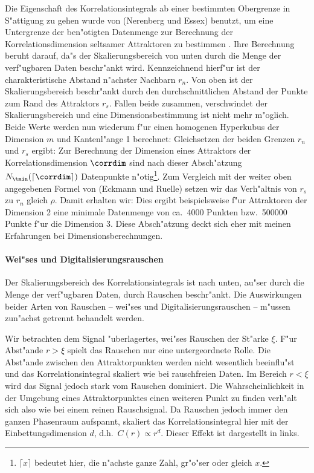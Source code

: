 Die Eigenschaft des Korrelationsintegrals ab einer bestimmten Obergrenze in S"attigung zu
gehen wurde von \autor(Nerenberg und Essex) benutzt, um eine Untergrenze der
ben"otigten Datenmenge zur Berechnung der Korrelationsdimension seltsamer Attraktoren
 zu bestimmen \cite{Nerenberg-essex}. Ihre Berechnung beruht darauf, da"s der Skalierungsbereich
von unten durch die Menge der verf"ugbaren Daten beschr"ankt wird. Kennzeichnend hierf"ur
ist der charakteristische Abstand n"achster Nachbarn $r_n$. Von oben ist der Skalierungsbereich
beschr"ankt durch den durchschnittlichen Abstand der Punkte zum Rand des Attraktors
$r_s$. Fallen beide zusammen, verschwindet der Skalierungsbereich und eine
Dimensionsbestimmung ist nicht mehr m"oglich. Beide Werte werden nun wiederum f"ur einen
homogenen Hyperkubus der Dimension $m$ und Kantenl"ange 1 berechnet\footnotemark:
Gleichsetzen der beiden Grenzen $r_n$ und $r_s$ ergibt:
Zur Berechnung der Dimension eines Attraktors der Korrelationsdimension $\corrdim$ sind nach
dieser Absch"atzung $N_\tmin(\lceil \corrdim \rceil)$ Datenpunkte n"otig\footnote{$\lceil x \rceil$
bedeutet hier, die n"achste ganze Zahl, gr"o"ser oder gleich $x$.}. Zum Vergleich mit der
weiter oben angegebenen Formel von \autor(Eckmann und Ruelle) setzen wir das Verh"altnis
von $r_s$ zu $r_n$ gleich $\rho$. Damit erhalten wir:
Dies ergibt beispielsweise f"ur Attraktoren der Dimension 2 eine minimale Datenmenge von
ca.\  4000 Punkten bzw.\  500000 Punkte f"ur die Dimension 3. Diese Absch"atzung deckt
sich eher mit meinen Erfahrungen bei Dimensionsberechnungen. 





\paragraph{Wei"ses und Digitalisierungsrauschen}
Der Skalierungsbereich des Korrelationsintegrals ist nach unten, au"ser durch die Menge der 
verf"ugbaren Daten, durch Rauschen beschr"ankt. Die Auswirkungen beider Arten von
Rauschen -- wei"ses und Digitalisierungsrauschen -- m"ussen zun"achst getrennt behandelt
werden. 

Wir betrachten dem Signal "uberlagertes, wei"ses Rauschen der St"arke $\xi$. F"ur Abst"ande 
$r>\xi$ spielt das Rauschen nur eine untergeordnete Rolle. Die Abst"ande zwischen den
Attraktorpunkten werden nicht wesentlich beeinflu"st und das Korrelationsintegral skaliert 
wie bei rauschfreien Daten. 
Im Bereich $r<\xi$ wird das Signal jedoch stark vom Rauschen dominiert. Die
Wahrscheinlichkeit in der Umgebung eines Attraktorpunktes einen weiteren Punkt zu finden
verh"alt sich also wie bei einem reinen Rauschsignal. Da Rauschen jedoch immer den ganzen
Phasenraum aufspannt, skaliert das Korrelationsintegral hier mit der Einbettungsdimension
$d$, d.h.\  $C(r)\propto r^d$. Dieser Effekt ist dargestellt in  links.


